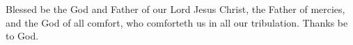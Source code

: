 Blessed be the God and Father of our Lord Jesus Christ, the Father of mercies, and the God of all comfort, who comforteth us in all our tribulation. \rubric{\Rbar}Thanks be to God.